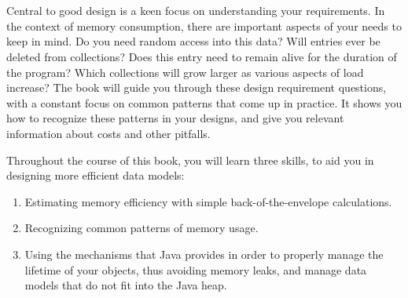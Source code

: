 \section{\thetitle}



Central to good design is a keen focus on understanding your requirements.
In the context of memory consumption, there are important aspects of your needs
to keep in mind. Do you need random access into this data? Will entries ever be
deleted from collections? Does this entry need to remain alive for the duration
of the program? Which collections will grow larger as various aspects of load
increase? The book will guide you through these design requirement questions,
with a constant focus on common patterns that come up in practice. It shows you
how to recognize these patterns in your designs, and give you relevant
information about costs and other pitfalls.

Throughout the course of this book, you will learn three skills, to aid you in
designing more efficient data models:
\begin{enumerate}
  \item Estimating memory efficiency with simple back-of-the-envelope
  calculations.
  \item Recognizing common patterns of memory usage.
  \item Using the mechanisms that Java provides in order to properly manage the
  lifetime of your objects, thus avoiding memory leaks, and manage data models
  that do not fit into the Java heap.
\end{enumerate} 




